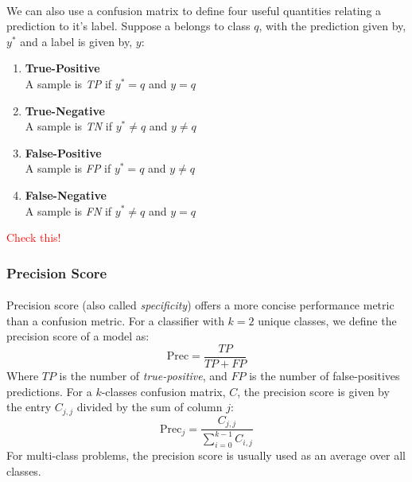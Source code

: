 \documentclass[12pt,letterpaper]{article}
\begin{document}
\paragraph*{}We can also use a confusion matrix to define four useful quantities relating a prediction to it's label. Suppose a belongs to class $q$, with the prediction given by, $y^*$ and a label is given by, $y$:
\begin{enumerate}
\item \textbf{True-Positive}\\
A sample is \textit{TP} if $y^* = q$ and $y = q$
\item \textbf{True-Negative}\\
A sample is \textit{TN} if $y^* \neq q$ and $y \neq q$ 
\item \textbf{False-Positive}\\
A sample is \textit{FP} if $y^* = q$ and $y \neq q$ 
\item \textbf{False-Negative}\\
A sample is \textit{FN} if $y^* \neq q$ and $y = q$
\end{enumerate}
\textcolor{red}{Check this!}


\subsubsection{Precision Score}

\paragraph*{}Precision score (also called \textit{specificity}) offers a more concise performance metric than a confusion metric. For a classifier with $k = 2$ unique classes, we define the precision score of a model as:
\begin{equation}
\label{eqn-BinaryPrecision}
\text{Prec} = \frac{TP}{TP + FP}
\end{equation}
Where $TP$ is the number of \textit{true-positive}, and $FP$ is the number of false-positives predictions. For a $k$-classes confusion matrix, $C$, the precision score is given by the entry $C_{j,j}$ divided by the sum of column $j$:
\begin{equation}
\label{eqn-KPrecision}
\text{Prec}_j = \frac{C_{j,j}}{\sum_{i=0}^{k-1}C_{i,j}}
\end{equation}
For multi-class problems, the precision score is usually used as an average over all classes. 
\end{document}
